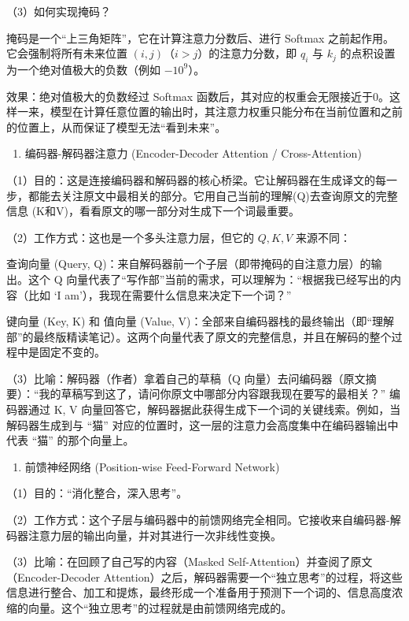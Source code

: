 （3）如何实现掩码？

掩码是一个``上三角矩阵''，它在计算注意力分数后、进行 Softmax 之前起作用。它会强制将所有未来位置 \((i,j)\)（\(i>j\)）的注意力分数，即 \(q_i\) 与 \(k_j\) 的点积设置为一个绝对值极大的负数（例如 \(-10^9\)）。

效果：绝对值极大的负数经过 Softmax 函数后，其对应的权重会无限接近于0。这样一来，模型在计算任意位置的输出时，其注意力权重只能分布在当前位置和之前的位置上，从而保证了模型无法``看到未来''。

\begin{enumerate}
\def\labelenumi{\arabic{enumi}.}
\setcounter{enumi}{1}
\tightlist
\item
  编码器-解码器注意力 (Encoder-Decoder Attention / Cross-Attention)
\end{enumerate}

（1）目的：这是连接编码器和解码器的核心桥梁。它让解码器在生成译文的每一步，都能去关注原文中最相关的部分。它用自己当前的理解(Q)去查询原文的完整信息 (K和V)，看看原文的哪一部分对生成下一个词最重要。

（2）工作方式：这也是一个多头注意力层，但它的 \(Q,K,V\) 来源不同：

查询向量 (Query, Q)：来自解码器前一个子层（即带掩码的自注意力层）的输出。这个 Q 向量代表了``写作部''当前的需求，可以理解为：``根据我已经写出的内容（比如 `I am'），我现在需要什么信息来决定下一个词？''

键向量 (Key, K) 和 值向量 (Value, V)：全部来自编码器栈的最终输出（即``理解部''的最终版精读笔记）。这两个向量代表了原文的完整信息，并且在解码的整个过程中是固定不变的。

（3）比喻：解码器（作者）拿着自己的草稿（Q 向量）去问编码器（原文摘要）：``我的草稿写到这了，请问你原文中哪部分内容跟我现在要写的最相关？'' 编码器通过 K, V 向量回答它，解码器据此获得生成下一个词的关键线索。例如，当解码器生成到与 ``猫'' 对应的位置时，这一层的注意力会高度集中在编码器输出中代表 ``猫'' 的那个向量上。

\begin{enumerate}
\def\labelenumi{\arabic{enumi}.}
\setcounter{enumi}{2}
\tightlist
\item
  前馈神经网络 (Position-wise Feed-Forward Network)
\end{enumerate}

（1）目的：``消化整合，深入思考''。

（2）工作方式：这个子层与编码器中的前馈网络完全相同。它接收来自编码器-解码器注意力层的输出向量，并对其进行一次非线性变换。

（3）比喻：在回顾了自己写的内容（Masked Self-Attention）并查阅了原文（Encoder-Decoder Attention）之后，解码器需要一个``独立思考''的过程，将这些信息进行整合、加工和提炼，最终形成一个准备用于预测下一个词的、信息高度浓缩的向量。这个``独立思考''的过程就是由前馈网络完成的。

